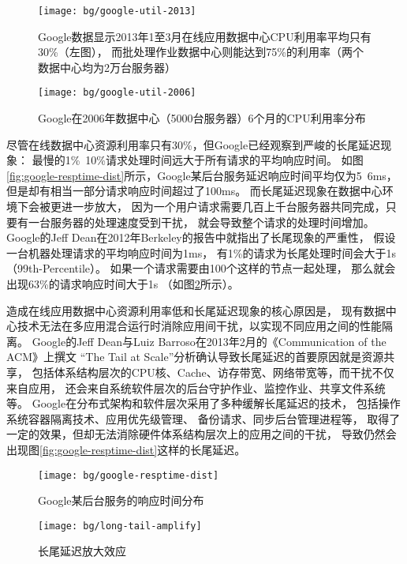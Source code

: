 \begin{figure}
\begin{minipage}{0.57\textwidth}
  \centering
  \texttt{[image: bg/google-util-2013]}
  \caption[Google数据中心CPU利用率分布（2013年）]
    {Google数据显示2013年1至3月在线应用数据中心CPU利用率平均只有30\%（左图），
     而批处理作业数据中心则能达到75\%的利用率（两个数据中心均为2万台服务器）}
  \label{fig:google-util-2013}
\end{minipage}\hfill
\begin{minipage}{0.39\textwidth}
  \centering
  \texttt{[image: bg/google-util-2006]}
  \caption[Google数据中心CPU利用率分布（2006年）]
    {Google在2006年数据中心（5000台服务器）6个月的CPU利用率分布}
  \label{fig:google-util-2006}
\end{minipage}
\end{figure}

尽管在线数据中心资源利用率只有30\%，但Google已经观察到严峻的长尾延迟现象：
最慢的1\%~10\%请求处理时间远大于所有请求的平均响应时间。
如图\ref{fig:google-resptime-dist}所示，Google某后台服务延迟响应时间平均仅为5~6ms，
但是却有相当一部分请求响应时间超过了100ms\cite{Krushevskaja:2013}。
而长尾延迟现象在数据中心环境下会被更进一步放大，
因为一个用户请求需要几百上千台服务器共同完成，只要有一台服务器的处理速度受到干扰，
就会导致整个请求的处理时间增加。
Google的Jeff Dean在2012年Berkeley的报告\cite{dean_achieving_2012}中就指出了长尾现象的严重性，
假设一台机器处理请求的平均响应时间为1ms，
有1\%的请求为长尾处理时间会大于1s（99th-Percentile）。
如果一个请求需要由100个这样的节点一起处理，
那么就会出现63\%的请求响应时间大于1s
（如图\ref{fig:long-tail-amplify}所示）。

造成在线应用数据中心资源利用率低和长尾延迟现象的核心原因是，
现有数据中心技术无法在多应用混合运行时消除应用间干扰，以实现不同应用之间的性能隔离。
Google的Jeff Dean与Luiz Barroso在2013年2月的《Communication of the ACM》上撰文
``The Tail at Scale''\cite{dean_tail_2013}分析确认导致长尾延迟的首要原因就是资源共享，
包括体系结构层次的CPU核、Cache、访存带宽、网络带宽等，而干扰不仅来自应用，
还会来自系统软件层次的后台守护作业、监控作业、共享文件系统等。
Google在分布式架构和软件层次采用了多种缓解长尾延迟的技术，
包括操作系统容器隔离技术\cite{cgroup}、应用优先级管理\cite{google_trace}、
备份请求\cite{dean_achieving_2012}、同步后台管理进程\cite{dean_achieving_2012}等，
取得了一定的效果，但却无法消除硬件体系结构层次上的应用之间的干扰，
导致仍然会出现图\ref{fig:google-resptime-dist}这样的长尾延迟。

\begin{figure}
\begin{minipage}{0.44\textwidth}
  \centering
  \texttt{[image: bg/google-resptime-dist]}
  \caption[Google某后台服务的响应时间分布]{Google某后台服务的响应时间分布\cite{Krushevskaja:2013}}
  \label{fig:google-resptime-dist}
\end{minipage}\hfill
\begin{minipage}{0.52\textwidth}
  \centering
  \texttt{[image: bg/long-tail-amplify]}
  \caption[长尾延迟放大效应]{长尾延迟放大效应\cite{dean_tail_2013}}
  \label{fig:long-tail-amplify}
\end{minipage}
\end{figure}

